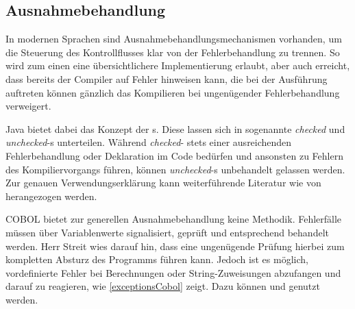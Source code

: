 \subsection{Ausnahmebehandlung} \label{exceptions}

In modernen Sprachen sind Ausnahmebehandlungsmechanismen vorhanden, um die Steuerung des Kontrollflusses klar von der Fehlerbehandlung zu trennen. So wird zum einen eine übersichtlichere Implementierung erlaubt, aber auch erreicht, dass bereits der Compiler auf Fehler hinweisen kann, die bei der Ausführung auftreten können \bzw gänzlich das Kompilieren bei ungenügender Fehlerbehandlung verweigert.

Java bietet dabei das Konzept der s. Diese lassen sich in sogenannte \textit{checked} und \textit{unchecked}-s unterteilen. Während \textit{checked}- stets einer ausreichenden Fehlerbehandlung oder Deklaration im Code bedürfen und ansonsten zu Fehlern des Kompiliervorgangs führen, können \textit{unchecked}-s unbehandelt gelassen werden. Zur genauen Verwendungserklärung kann weiterführende Literatur wie  von \citeauthor{byrne_java_2009-1} herangezogen werden.


COBOL bietet zur generellen Ausnahmebehandlung keine Methodik. Fehlerfälle müssen über Variablenwerte signalisiert, geprüft und entsprechend behandelt werden. Herr Streit wies darauf hin, dass eine ungenügende Prüfung hierbei zum kompletten Absturz des Programms führen kann. Jedoch ist es möglich, vordefinierte Fehler bei Berechnungen oder String-Zuweisungen abzufangen und darauf zu reagieren, wie \autoref{exceptionsCobol} zeigt. Dazu können  und  genutzt werden.